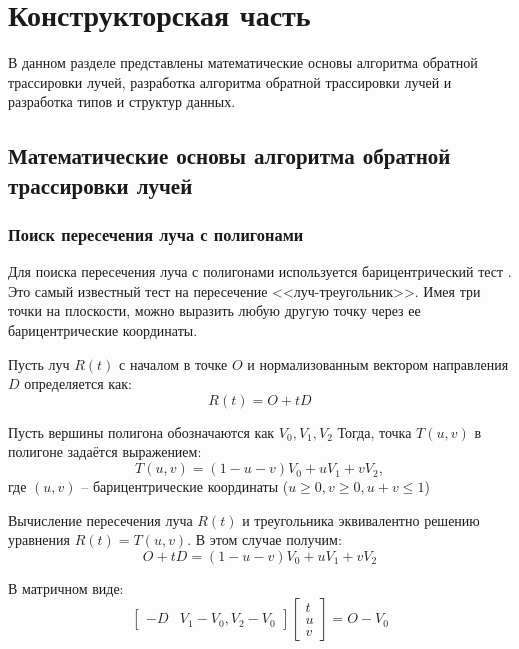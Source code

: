 \chapter{Конструкторская часть}

В данном разделе представлены математические основы алгоритма обратной трассировки лучей, разработка алгоритма обратной трассировки лучей и разработка типов и структур данных.

\section{Математические основы алгоритма обратной трассировки лучей}

\subsection{Поиск пересечения луча с полигонами}

Для поиска пересечения луча с полигонами используется барицентрический тест \cite{triangleintersection}. Это самый известный тест на пересечение <<луч-треугольник>>. Имея три точки на плоскости, можно выразить любую другую точку через ее барицентрические координаты.

Пусть луч $R(t)$ с началом в точке $O$ и нормализованным вектором направления $D$ определяется как:
\begin{equation}
	R(t) = O + tD
\end{equation}

Пусть вершины полигона обозначаются как $V_0, V_1, V_2$
Тогда, точка $T(u,v)$ в полигоне задаётся выражением:
\begin{equation}
	T(u,v) = (1 - u - v)V_0 + uV_1 + vV_2,
\end{equation}
где $(u,v)$ -- барицентрические координаты ($u \geq 0, v \geq 0, u + v \leq 1$)

Вычисление пересечения луча $R(t)$ и треугольника эквивалентно решению уравнения
$R(t) = T(u, v)$. В этом случае получим:
\begin{equation}
	O + tD = (1- u - v)V_0 + uV_1 + vV_2
\end{equation}

В матричном виде:
\begin{equation}
\label{slau}
\begin{bmatrix}
	-D & V_1 - V_0, V_2 - V_0
\end{bmatrix}
\begin{bmatrix}
t\\
u\\
v
\end{bmatrix} = O - V_0 
\end{equation}


